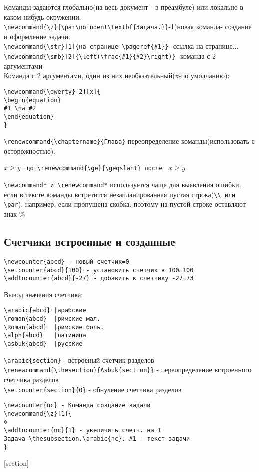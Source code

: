 \documentclass[a4paper,12pt]{article}%
\theoremstyle{plain}%
\theoremstyle{definition}%
\theoremstyle{remark}%
\begin{document}
Команды задаются глобально(на весь документ - в преамбуле) или локально в каком-нибудь окружении. \\
\verb|\newcommand{\z}{\par\noindent\textbf{Задача.}}|-1)новая команда- создание и оформление задачи. \\
\verb|\newcommand{\str}[1]{на странице \pageref{#1}}|- ссылка на странице... \\
\verb|\newcommand{\smb}[2]{\left(\frac{#1}{#2}\right)}|- команда с 2 аргументами \\
Команда с 2 аргументами, один из них необязательный(x-по умолчанию):
\begin{verbatim}
\newcommand{\qwerty}[2][x]{
\begin{equation}
#1 \nw #2
\end{equation}
}
\end{verbatim}

\verb|\renewcommand{\chaptername}{Глава}|-переопределение команды(использовать с осторожностью).

$x \ge y$%
\verb| до \renewcommand{\ge}{\geqslant} после |
\renewcommand{\ge}{\geqslant}
$x \ge y$%

\verb|\newcommand* и \renewcommand*| используется чаще для выявления ошибки, если в тексте команды встретится незапланированная пустая строка(\verb|\\ или \par|), например, если пропущена скобка. поэтому на пустой строке оставляют знак \%



\subsection{Счетчики встроенные и созданные}

\begin{verbatim}
\newcounter{abcd} - новый счетчик=0
\setcounter{abcd}{100} - установить счетчик в 100=100
\addtocounter{abcd}{-27} - добавить к счетчику -27=73
\end{verbatim}

Вывод значения счетчика:
\begin{verbatim}
\arabic{abcd} |арабские
\roman{abcd}  |римские мал.
\Roman{abcd}  |римские боль.
\alph{abcd}   |латиница
\asbuk{abcd}  |русские
\end{verbatim}

\noindent\verb|\arabic{section}| - встроеный счетчик разделов \\
\verb|\renewcommand{\thesection}{Asbuk{section}}| - переопределение встроенного счетчика разделов \\
\verb|\setcounter{section}{0}| - обнуление счетчика разделов \\
\begin{verbatim}
\newcounter{nc} - Команда создание задачи
\newcommand{\z}[1]{
%
\addtocounter{nc}{1} - увеличить счетч. на 1
Задача \thesubsection.\arabic{nc}. #1 - текст задачи
}
\end{verbatim}
[section]
\newcommand{\z}[1]{%

\addtocounter{nc}{1}%
Задача \thesubsection.\arabic{nc}. #1%
}
\end{document}
